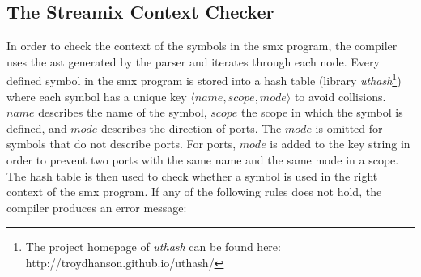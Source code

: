 \subsection{The Streamix Context Checker}
\label{sect_tool_smxc_context}
In order to check the context of the symbols in the \gls*{smx} program, the compiler uses the \gls{ast} generated by the parser and iterates through each node.
Every defined symbol in the \gls*{smx} program is stored into a hash table (library \emph{uthash}\footnote{The project homepage of \emph{uthash} can be found here: http://troydhanson.github.io/uthash/}) where each symbol has a unique key $\langle name, scope, mode \rangle$ to avoid collisions.
$name$ describes the name of the symbol, $scope$ the scope in which the symbol is defined, and $mode$ describes the direction of ports.
The $mode$ is omitted for symbols that do not describe ports.
For ports, $mode$ is added to the key string in order to prevent two ports with the same name and the same mode in a scope.
The hash table is then used to check whether a symbol is used in the right context of the \gls*{smx} program.
If any of the following rules does not hold, the compiler produces an error message:
